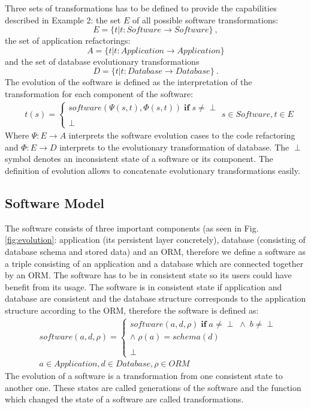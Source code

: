 \documentclass[runningheads]{comsis}
\begin{document}
Three sets of transformations has to be defined to provide the capabilities described in Example 2: the set $E$ of all possible software transformations:
\begin{equation}
E = \{t | t: Software \rightarrow Software\}\:,
\end{equation}
the set of application refactorings:
\begin{equation}
A = \{t | t: Application \rightarrow Application\}
\end{equation}
and the set of database evolutionary transformations
\begin{equation}
 D = \{t | t: Database \rightarrow Database\}\:.
\end{equation}
The evolution of the software is defined as the interpretation of the transformation for each component of the software:
\begin{align}
& t(s) = \begin{cases}
software(\Psi(s, t), \Phi(s,t)) \; \mathbf{if} \; s \neq \perp \\\\
 	\perp
\end{cases}
s \in Software, t \in E \nonumber
\end{align}
Where $\Psi : E \rightarrow A $ interprets the software evolution cases to the code refactoring and $\Phi : E \rightarrow D $ interprets to the evolutionary transformation of database. The $\perp$ symbol denotes an inconsistent state of a software or its component. The definition of evolution allows to concatenate evolutionary transformations easily. 

\subsection{Software Model}
The software consists of three important components (as seen in Fig. \ref{fig:evolution}: application (its persistent layer concretely), database (consisting of database schema and stored data) and an ORM, therefore we define a software as a triple consisting of an application and a database which are connected together by an ORM.
The software has to be in consistent state so its users could have benefit from its usage. The software is in consistent state if application and database are consistent and the database structure corresponds to the application structure according to the ORM, therefore the software is defined as:
\begin{align}
& software(a, d, \rho) = \begin{cases}
 software(a, d, \rho) \; \textbf{if} \; a \neq \perp \; \wedge \; b \neq \perp \\ \wedge \; \rho(a) = schema(d) 
 \\\\
 \perp
 \end{cases}\\
& a \in Application, d \in Database, \rho \in ORM \nonumber
\end{align}
The evolution of a software is a transformation from one consistent state to another one. These states are called generations of the software and the function which changed the state of a software are called transformations. 
\end{document}
